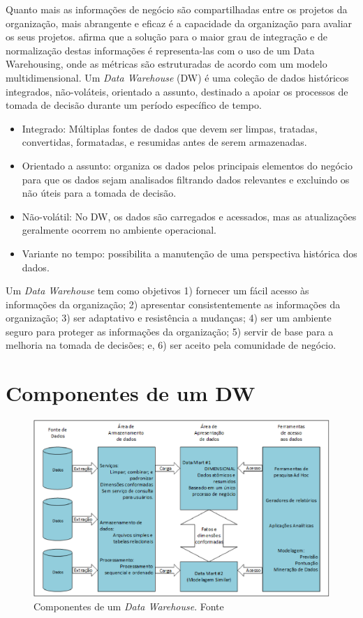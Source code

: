 Quanto mais as informações de negócio são compartilhadas entre os projetos da organização, mais abrangente e eficaz é a capacidade da organização para avaliar os seus projetos. \cite{ spdw} \cite{kimball} afirma que a solução para o maior grau de integração e de normalização destas informações é representa-las com o uso de um Data Warehousing, onde as métricas são estruturadas de acordo com um modelo multidimensional.
Um \textit{Data Warehouse} (DW) é uma coleção de dados históricos integrados, não-voláteis, orientado a assunto, destinado a apoiar os processos de tomada de decisão durante um período específico de tempo. \cite{kimball}
\begin{itemize}
\item Integrado: Múltiplas fontes de dados que devem ser limpas, tratadas, convertidas, formatadas, e resumidas antes de serem armazenadas. \cite{kimball}
\item Orientado a assunto: organiza os dados pelos principais elementos do negócio para que os dados sejam analisados filtrando dados relevantes e excluindo os não úteis para a tomada de decisão. \cite{kimball}
\item Não-volátil: No DW, os dados são carregados e acessados, mas as atualizações geralmente ocorrem no ambiente operacional. \cite{kimball}
\item Variante no tempo: possibilita a manutenção de uma perspectiva histórica dos dados. \cite{kimball}
\end{itemize}

Um \textit{Data Warehouse} tem como objetivos 1) fornecer um fácil acesso às informações da organização; 2) apresentar consistentemente as informações da organização; 3) ser adaptativo e resistência a mudanças; 4) ser um ambiente seguro para proteger as informações da organização; 5) servir de base para a melhoria na tomada de decisões; e, 6) ser aceito pela comunidade de negócio.

\section{Componentes de um DW}

\begin{figure}[!htb]
	\centering
		\includegraphics[scale=0.7]{figuras/componentesdw.eps}
		\caption{Componentes de um \textit{Data Warehouse}. Fonte \cite{kimball}}
		\label{componentesdw}
\end{figure}

